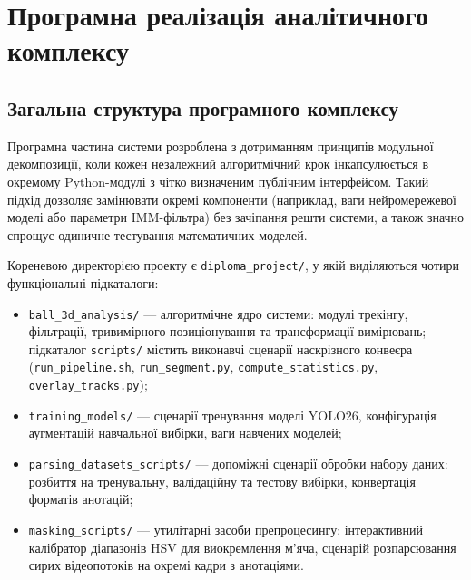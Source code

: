 

\section{Програмна реалізація аналітичного комплексу}

\subsection{Загальна структура програмного комплексу}

Програмна частина системи розроблена з дотриманням принципів модульної декомпозиції,
коли кожен незалежний алгоритмічний крок інкапсулюється в окремому Python-модулі з
чітко визначеним публічним інтерфейсом. Такий підхід дозволяє замінювати окремі
компоненти (наприклад, ваги нейромережевої моделі або параметри \gls{IMM}-фільтра)
без зачіпання решти системи, а також значно спрощує одиничне тестування математичних
моделей.

Кореневою директорією проекту є \texttt{diploma\_project/}, у якій виділяються чотири
функціональні підкаталоги:
\begin{itemize}
    \item \texttt{ball\_3d\_analysis/} --- алгоритмічне ядро системи: модулі трекінгу,
    фільтрації, тривимірного позиціонування та трансформації вимірювань; підкаталог
    \texttt{scripts/} містить виконавчі сценарії наскрізного конвеєра
    (\texttt{run\_pipeline.sh}, \texttt{run\_segment.py},
    \texttt{compute\_statistics.py}, \texttt{overlay\_tracks.py});
    \item \texttt{training\_models/} --- сценарії тренування моделі \gls{YOLO}26,
    конфігурація аугментацій навчальної вибірки, ваги навчених моделей;
    \item \texttt{parsing\_datasets\_scripts/} --- допоміжні сценарії обробки набору
    даних: розбиття на тренувальну, валідаційну та тестову вибірки, конвертація
    форматів анотацій;
    \item \texttt{masking\_scripts/} --- утилітарні засоби препроцесингу: інтерактивний
    калібратор діапазонів HSV для виокремлення м'яча, сценарій розпарсювання сирих
    відеопотоків на окремі кадри з анотаціями.
\end{itemize}


